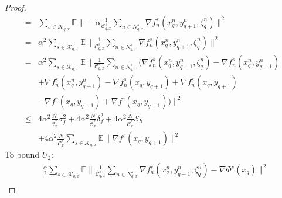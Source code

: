 \documentclass[lettersize,journal]{IEEEtran}
\begin{document}
\begin{proof}
\begin{align*}
    =&\sum_{s\in \mathcal{K}_{q,x}}\mathbb{E}\|-\alpha\frac{1}{\mathcal{C}^{s}_{q,x}}\sum_{n\in N_{q,x}^{s}}\nabla f^s_n(x_{q}^n,y_{q+1}^n,\zeta_q^n)\|^2\\
    =&\alpha^2\sum_{s\in \mathcal{K}_{q,x}}\mathbb{E}\|\frac{1}{\mathcal{C}^{s}_{q,x}}\sum_{n\in N^{s}_{q,x}}\nabla f^s_n(x_{q}^n,y_{q+1}^n,\zeta_q^n)\|^2\\
    = &\alpha^2\sum_{s\in \mathcal{K}_{q,x}}\mathbb{E}\|\frac{1}{\mathcal{C}^{s}_{q,x}}\sum_{n\in N^{s}_{q,x}}(\nabla f^s_n(x_{q}^n,y_{q+1}^n,\zeta_q^n)-\nabla f^s_n(x_{q}^n,y_{q+1}^n)\\
    &+\nabla f^s_n(x_{q}^n,y_{q+1}^n)-\nabla f^s_n(x_{q},y_{q+1})+\nabla f^s_n(x_{q},y_{q+1})\\
    &-\nabla f^s(x_{q},y_{q+1})+\nabla f^s(x_{q},y_{q+1}))\|^2 \\
    \leq&4\alpha^2\frac{N}{\mathcal{C}_x^*}\sigma_f^2+4\alpha^2\frac{N}{\mathcal{C}_x^*}\delta^2_f+4\alpha^2\frac{N}{\mathcal{C}_x^*}\mathcal{E}_h\\&+4\alpha^2\frac{N}{\mathcal{C}_x^*}\sum_{s\in \mathcal{K}_{q,x}}\mathbb{E}\|\nabla f^s(x_{q},y_{q+1})\|^2
\end{align*}
To bound $U_2$:
\begin{align*}
    &\frac{\alpha}{2}\sum_{s\in \mathcal{K}_{q,x}}\mathbb{E}\|\frac{1}{\mathcal{C}^{s}_{q,x}}\sum_{n\in N^{s}_{q,x}}\nabla f^s_n(x_{q}^n,y_{q+1}^n,\zeta_q^n)-\nabla \Phi^s(x_{q})\|^2\\

\end{align*}
\end{proof}
\end{document}
